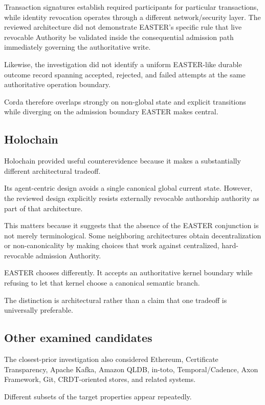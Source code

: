 \documentclass[11pt]{article}
\begin{document}
Transaction signatures establish required participants for particular transactions, while identity revocation operates through a different network/security layer. The reviewed architecture did not demonstrate EASTER's specific rule that live revocable Authority be validated inside the consequential admission path immediately governing the authoritative write.

Likewise, the investigation did not identify a uniform EASTER-like durable outcome record spanning accepted, rejected, and failed attempts at the same authoritative operation boundary.

Corda therefore overlaps strongly on non-global state and explicit transitions while diverging on the admission boundary EASTER makes central.

\subsection{Holochain}

Holochain provided useful counterevidence because it makes a substantially different architectural tradeoff.

Its agent-centric design avoids a single canonical global current state. However, the reviewed design explicitly resists externally revocable authorship authority as part of that architecture.

This matters because it suggests that the absence of the EASTER conjunction is not merely terminological. Some neighboring architectures obtain decentralization or non-canonicality by making choices that work against centralized, hard-revocable admission Authority.

EASTER chooses differently. It accepts an authoritative kernel boundary while refusing to let that kernel choose a canonical semantic branch.

The distinction is architectural rather than a claim that one tradeoff is universally preferable.

\subsection{Other examined candidates}

The closest-prior investigation also considered Ethereum, Certificate Transparency, Apache Kafka, Amazon QLDB, in-toto, Temporal/Cadence, Axon Framework, Git, CRDT-oriented stores, and related systems.

Different subsets of the target properties appear repeatedly.
\end{document}
